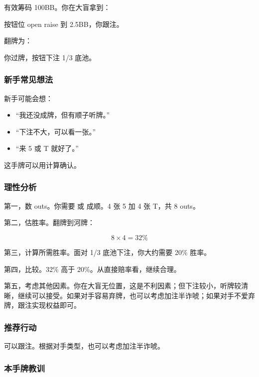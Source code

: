 有效筹码 100BB。你在大盲拿到：

\begin{center}
\end{center}

按钮位 open raise 到 2.5BB，你跟注。

翻牌为：

\begin{center}
\end{center}

你过牌，按钮下注 1/3 底池。

\subsubsection*{新手常见想法}

新手可能会想：

\begin{itemize}
\item “我还没成牌，但有顺子听牌。”
\item “下注不大，可以看一张。”
\item “来 5 或 T 就好了。”
\end{itemize}

这手牌可以用计算确认。

\subsubsection*{理性分析}

第一，数 outs。你需要  或  成顺。4 张 5 加 4 张 T，共 8 outs。

第二，估胜率。翻牌到河牌：

\[
8 \times 4 = 32\%
\]

第三，计算所需胜率。面对 1/3 底池下注，你大约需要 20\% 胜率。

第四，比较。32\% 高于 20\%。从直接赔率看，继续合理。

第五，考虑其他因素。你在大盲无位置，这是不利因素；但下注较小，听牌较清晰，继续可以接受。如果对手容易弃牌，也可以考虑加注半诈唬；如果对手不爱弃牌，跟注实现权益即可。

\subsubsection*{推荐行动}

可以跟注。根据对手类型，也可以考虑加注半诈唬。

\subsubsection*{本手牌教训}


